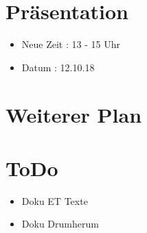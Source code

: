 \documentclass{article}
\begin{document}
\section{Präsentation}

\begin{itemize}

\item Neue Zeit : 13 - 15 Uhr

\item Datum : 12.10.18

\end{itemize}

\section{Weiterer Plan}



\section{ToDo}

\begin{itemize}

\item Doku ET Texte

\item Doku Drumherum

\end{itemize}
\end{document}
